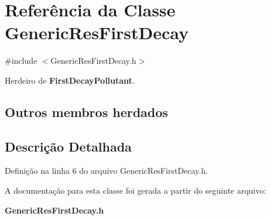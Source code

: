 \section{Referência da Classe Generic\+Res\+First\+Decay}
\label{class_generic_res_first_decay}


{\ttfamily \#include $<$Generic\+Res\+First\+Decay.\+h$>$}



Herdeiro de {\bf First\+Decay\+Pollutant}.

\subsection*{Outros membros herdados}


\subsection{Descrição Detalhada}


Definição na linha 6 do arquivo Generic\+Res\+First\+Decay.\+h.



A documentação para esta classe foi gerada a partir do seguinte arquivo\+:\begin{DoxyCompactItemize}
\item 
{\bf Generic\+Res\+First\+Decay.\+h}\end{DoxyCompactItemize}
